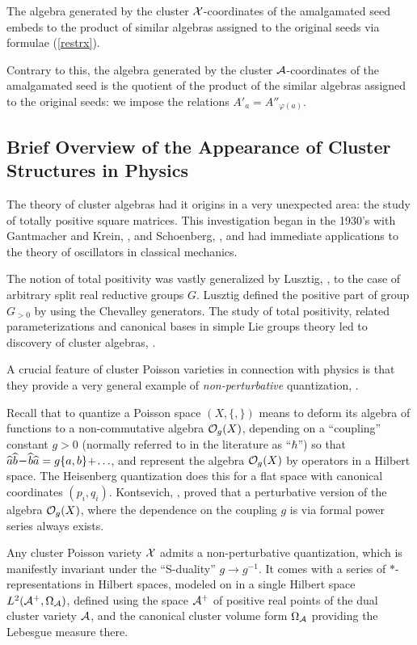 \documentclass[12pt,hyperref,compress]{JHEP3}
\newcommand{\mi}{{\rm\rule[2.4pt]{6pt}{0.65pt}}}
\newcommand{\pl}{\hspace{0.5pt}\text{{\small+}}\hspace{-0.5pt}}
\begin{document}
The algebra generated by the cluster ${\cal X}$-coordinates of the amalgamated seed embeds to the product of similar algebras assigned to the original seeds via formulae (\ref{restrx}).

Contrary to this, the algebra generated by the cluster ${\cal A}$-coordinates of the amalgamated seed is the quotient of the product of the similar algebras assigned to the original seeds: we impose the relations  $A'_a = A''_{\varphi(a)}$.



\newpage
\subsection{Brief Overview of the Appearance of Cluster Structures in Physics}

The theory of cluster algebras had it origins in a very unexpected area: the study of totally positive square matrices. This investigation began in the 1930's with Gantmacher and Krein, \cite{GKr}, and Schoenberg, \cite{Sch}, and had immediate applications to the theory of oscillators in classical mechanics.

The notion of total positivity was vastly generalized by Lusztig, \cite{L2}, to the case of arbitrary split real reductive groups $G$. Lusztig defined the positive part of group $G_{>0}$ by using the Chevalley generators. The study of total positivity, related parameterizations and canonical bases in simple Lie groups theory led to discovery of cluster algebras, \cite{FZ}.


A crucial feature of cluster Poisson varieties in connection with physics is that they provide a very general example of {\it non-perturbative} quantization, \cite{FG4}.

Recall that to quantize a Poisson space $(X, \{,\})$ means to deform its algebra of functions to a non-commutative algebra ${\cal O}_g({X})$, depending on a ``coupling'' constant $g>0$ (normally referred to in the literature as ``$\hbar$'') so that $\widehat a\widehat b\,\mi\,\widehat b \widehat a = g \{a,b\}\pl\ldots$, and represent the algebra ${\cal O}_g({X})$  by operators in a Hilbert space. The Heisenberg quantization does this for a flat space with canonical coordinates $(p_i, q_i)$. Kontsevich, \cite{Kontsevich}, proved that a perturbative version of the algebra ${\cal O}_g({X})$, where the dependence on the coupling $g$ is via formal power series always exists.

Any cluster Poisson variety ${\cal X}$ admits a  {non-perturbative quantization},  which is manifestly invariant under the ``S-duality'' $g\!\to\! g^{-1}$. It comes with a series of $\ast$-representations in  Hilbert spaces, modeled on in a single Hilbert space $L^2({\cal A}^+, \Omega_{\cal A})$, defined using the space ${\cal A}^+$ of positive real points of the dual cluster variety ${\cal A}$, and the canonical cluster volume form $\Omega_{\cal A}$ providing the Lebesgue measure there. 
\end{document}
